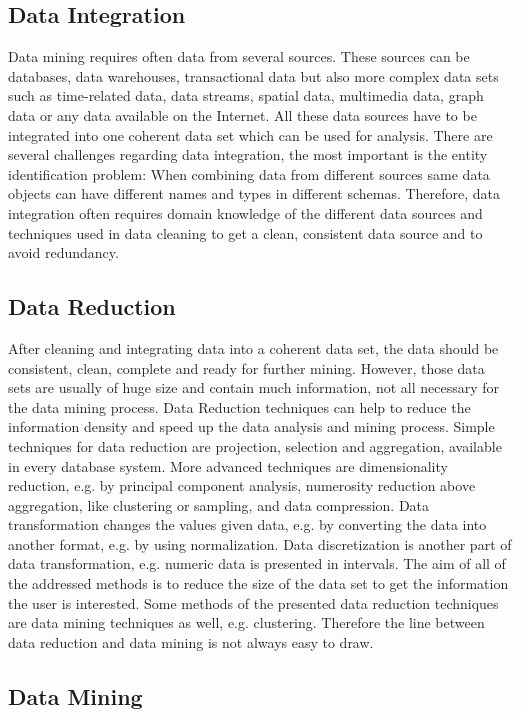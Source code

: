 \subsection{Data Integration}

Data mining requires often data from several sources. These sources can be databases, data warehouses, transactional data but also more complex data sets such as time-related data, data streams, spatial data, multimedia data, graph data or any data available on the Internet. All these data sources have to be integrated into one coherent data set which can be used for analysis. There are several challenges regarding data integration, the most important is the entity identification problem: When combining data from different sources same data objects can have different names and types in different schemas. Therefore, data integration often requires domain knowledge of the different data sources and techniques used in data cleaning to get a clean, consistent data source and to avoid redundancy.


\subsection{Data Reduction}

After cleaning and integrating data into a coherent data set, the data should be consistent, clean, complete and ready for further mining. However, those data sets are usually of huge size and contain much information, not all necessary for the data mining process. Data Reduction techniques can help to reduce the information density and speed up the data analysis and mining process. Simple techniques for data reduction are projection, selection and aggregation, available in every database system. More advanced techniques are dimensionality reduction, e.g. by principal component analysis, numerosity reduction above aggregation, like clustering or sampling, and data compression. 
Data transformation changes the values given data, e.g. by converting the data into another format, e.g. by using normalization. Data discretization is another part of data transformation, e.g. numeric data is presented in intervals. 
The aim of all of the addressed methods is to reduce the size of the data set to get the information the user is interested. Some methods of the presented data reduction techniques are data mining techniques as well, e.g. clustering. Therefore the line between data reduction and data mining is not always easy to draw.


\subsection{Data Mining}

